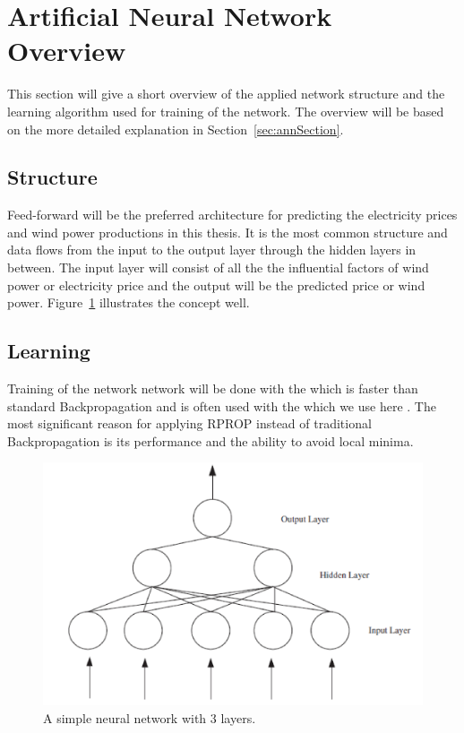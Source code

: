 \section{Artificial Neural Network Overview}
This section will give a short overview of the applied network structure and the learning algorithm used for training of the network. The overview will be based on the more detailed explanation in Section~\ref{sec:annSection}.

\subsection{Structure}
Feed-forward will be the preferred architecture for predicting the electricity prices and wind power productions in this thesis. It is the most common structure and data flows from the input to the output layer through the hidden layers in between. The input layer will consist of all the the influential factors of wind power or electricity price and the output will be the predicted price or wind power. Figure~\ref{fig:overviewAnn} illustrates the concept well.

\subsection{Learning}
Training of the network network will be done with the  which is faster than standard Backpropagation \cite{15} and is often used with the  which we use here \cite{17}. The most significant reason for applying RPROP instead of traditional Backpropagation is its performance and the ability to avoid local minima.

\begin{figure}[h]
\centering
\includegraphics[width=0.8\linewidth]{billeder/ANN.png}
\caption{A simple neural network with 3 layers. \cite{stockForecasting}}
\label{fig:overviewAnn}
\end{figure}

